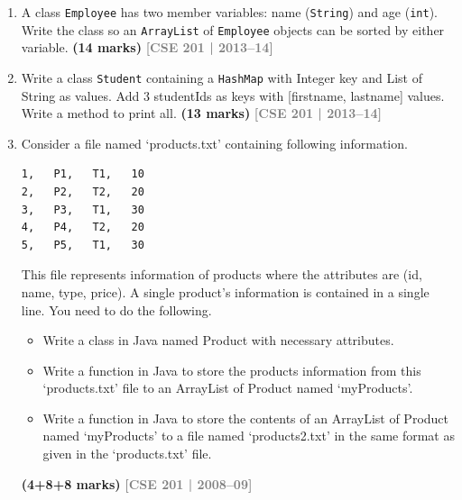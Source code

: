 \documentclass[12pt,a3paper]{article}
\newcommand{\yr}[1]{\hfill\textcolor{gray}{\small\textbf{[#1]}}}
\newcommand{\mk}[1]{\textcolor{orange!70!black}{\small\textbf{(#1 marks)}}}
\begin{document}
\begin{enumerate}





\item A class \texttt{Employee} has two member variables: name (\texttt{String}) and age (\texttt{int}). Write the class so an \texttt{ArrayList} of \texttt{Employee} objects can be sorted by either variable. \mk{14}
\yr{CSE 201 | 2013--14}




\item Write a class \texttt{Student} containing a \texttt{HashMap} with Integer key and List of String as values. Add 3 studentIds as keys with [firstname, lastname] values. Write a method to print all. \mk{13}
\yr{CSE 201 | 2013--14}




\item Consider a file named `products.txt' containing following information.

\begin{center}
\begin{verbatim}
1,   P1,   T1,   10
2,   P2,   T2,   20
3,   P3,   T1,   30
4,   P4,   T2,   20
5,   P5,   T1,   30
\end{verbatim}
\end{center}

This file represents information of products where the attributes are (id, name, type, price). A single product's information is contained in a single line. You need to do the following.

\begin{itemize}
    \item[(i)] Write a class in Java named Product with necessary attributes.
    \item[(ii)] Write a function in Java to store the products information from this `products.txt' file to an ArrayList of Product named `myProducts'.
    \item[(iii)] Write a function in Java to store the contents of an ArrayList of Product named `myProducts' to a file named `products2.txt' in the same format as given in the `products.txt' file.
\end{itemize}

\mk{4+8+8} \yr{CSE 201 | 2008--09}



\end{enumerate}
\newpage
\end{document}
